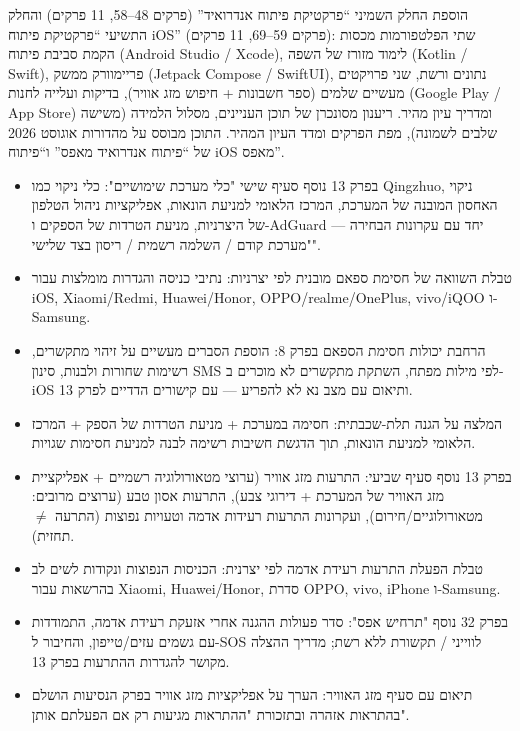 הוספת החלק השמיני “פרקטיקת פיתוח אנדרואיד” (פרקים 48–58, 11 פרקים) והחלק התשיעי “פרקטיקת פיתוח iOS” (פרקים 59–69, 11 פרקים): שתי הפלטפורמות מכסות הקמת סביבת פיתוח (Android Studio / Xcode), לימוד מזורז של השפה (Kotlin / Swift), פריימוורק ממשק (Jetpack Compose / SwiftUI), נתונים ורשת, שני פרויקטים מעשיים שלמים (ספר חשבונות + חיפוש מזג אוויר), בדיקות ועלייה לחנות (Google Play / App Store) ומדריך עיון מהיר. ריענון מסונכרן של תוכן העניינים, מסלול הלמידה (משישה שלבים לשמונה), מפת הפרקים ומדד העיון המהיר. התוכן מבוסס על מהדורות אוגוסט 2026 של “פיתוח אנדרואיד מאפס” ו“פיתוח iOS מאפס”.


\begin{itemize}
  \item בפרק 13 נוסף סעיף שישי "כלי מערכת שימושיים": כלי ניקוי כמו Qingzhuo, ניקוי האחסון המובנה של המערכת, המרכז הלאומי למניעת הונאות, אפליקציות ניהול הטלפון של היצרניות, מניעת הטרדות של הספקים ו-AdGuard — יחד עם עקרונות הבחירה "מערכת קודם / השלמה רשמית / ריסון בצד שלישי".
  \item טבלת השוואה של חסימת ספאם מובנית לפי יצרניות: נתיבי כניסה והגדרות מומלצות עבור iOS, Xiaomi/Redmi, Huawei/Honor, OPPO/realme/OnePlus, vivo/iQOO ו-Samsung.
  \item הרחבת יכולות חסימת הספאם בפרק 8: הוספת הסברים מעשיים על זיהוי מתקשרים, רשימות שחורות ולבנות, סינון SMS לפי מילות מפתח, השתקת מתקשרים לא מוכרים ב-iOS ותיאום עם מצב נא לא להפריע — עם קישורים הדדיים לפרק 13.
  \item המלצה על הגנה תלת-שכבתית: חסימה במערכת + מניעת הטרדות של הספק + המרכז הלאומי למניעת הונאות, תוך הדגשת חשיבות רשימה לבנה למניעת חסימות שגויות.
\end{itemize}


\begin{itemize}
  \item בפרק 13 נוסף סעיף שביעי: התרעות מזג אוויר (ערוצי מטאורולוגיה רשמיים + אפליקציית מזג האוויר של המערכת + דירוגי צבע), התרעות אסון טבע (ערוצים מרובים: מטאורולוגיים/חירום), ועקרונות התרעות רעידות אדמה וטעויות נפוצות (התרעה $\neq$ תחזית).
  \item טבלת הפעלת התרעות רעידת אדמה לפי יצרנית: הכניסות הנפוצות ונקודות לשים לב בהרשאות עבור Xiaomi, Huawei/Honor, סדרת OPPO, vivo, iPhone ו-Samsung.
  \item בפרק 32 נוסף "תרחיש אפס": סדר פעולות ההגנה אחרי אזעקת רעידת אדמה, התמודדות עם גשמים עזים/טייפון, והחיבור ל-SOS לווייני / תקשורת ללא רשת; מדריך ההצלה מקושר להגדרות ההתרעות בפרק 13.
  \item תיאום עם סעיף מזג האוויר: הערך על אפליקציות מזג אוויר בפרק הנסיעות הושלם בהתראות אזהרה ובתזכורת "ההתראות מגיעות רק אם הפעלתם אותן".
\end{itemize}

